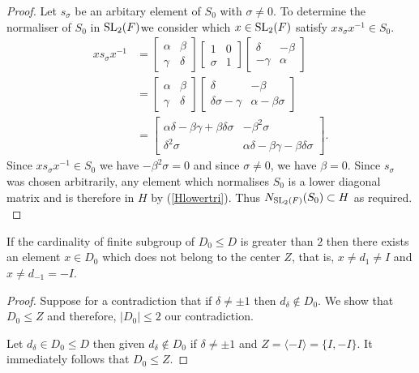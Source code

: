 \begin{proof}
Let $s_\sigma$ be an arbitary element of $S_0$ with $\sigma \neq 0$. To determine the normaliser of $S_0$ in $\operatorname{SL}_2(F)$we consider which $x \in \operatorname{SL}_2(F)$ satisfy $x s_\sigma x^{-1} \in S_0$.
\begin{align*} x s_\sigma x^{-1} &= \begin{bmatrix} \alpha & \beta \\ \gamma & \delta \end{bmatrix} \begin{bmatrix} 1 & 0 \\ \sigma & 1 \end{bmatrix} \begin{bmatrix} \delta & - \beta \\ - \gamma & \alpha \end{bmatrix}
\\[1.5ex] &= \begin{bmatrix} \alpha & \beta \\ \gamma & \delta \end{bmatrix} \begin{bmatrix} \delta & - \beta \\ \delta \sigma - \gamma & \alpha - \beta \sigma \end{bmatrix}
\\[1.5ex] &= \begin{bmatrix} \alpha \delta - \beta \gamma + \beta \delta \sigma & - \beta^2  \sigma \\ \delta^2 \sigma & \alpha \delta - \beta \gamma - \beta \delta \sigma \end{bmatrix}.
\end{align*}
Since $x s_\sigma x^{-1} \in S_0$ we have $- \beta^2  \sigma = 0$ and since $\sigma \neq 0$, we have $\beta = 0$. Since $s_\sigma$ was chosen arbitrarily, any element which normalises $S_0$ is a lower diagonal matrix and is therefore in $H$ by (\ref{Hlowertri}). Thus $N_{\operatorname{SL}_2(F)}(S_0) \subset H$ as required. \\
\end{proof}

\begin{lemma}
    \label{ex_of_card_D_gt_two}
    \leanok
    If the cardinality of finite subgroup of $D_0 \le D$ is greater than $2$ then there exists an element $x \in D_0$ which does not belong to the center $Z$, that is, $x \ne d_1 \ne I$ and $x \ne d_{-1} = -I$.
\end{lemma}
\begin{proof}
 Suppose for a contradiction that if $\delta \ne \pm 1$ then $d_\delta \notin D_0$. We show that $D_0 \le Z$ and therefore, $|D_0| \le 2$ our contradiction.
 
 Let $d_\delta \in D_0 \le D$ then given $d_\delta \notin D_0$ if $\delta \ne \pm 1$ and $Z = \langle -I\rangle = \{I, -I\}$. It immediately follows that $D_0 \le Z$.

\end{proof}


